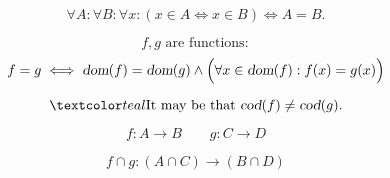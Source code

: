 
\begin{frame}{}
  \begin{center}
  \end{center}
\end{frame}

\begin{frame}{}
  \begin{axiom}
    \[
      \forall A: \forall B: \forall x: (x \in A \iff x \in B) \iff A = B.
    \]
  \end{axiom}

  \pause
  \vspace{0.80cm}
  \begin{theorem}
    \[
      f, g \text{ are functions}:
    \]
    \[
      f = g \iff \textsl{dom}(f) = \textsl{dom}(g) \land \Big(\forall x \in \textsl{dom}(f): f(x) = g(x)\Big)
    \]
  \end{theorem}

  \pause
  \[
    \teal{\text{It may be that } \cod{f} \neq \cod{g}.}
  \]
\end{frame}

\begin{frame}{}
  \[
    f: A \to B \qquad g: C \to D
  \]

  \begin{center}
  \end{center}

  \pause
  \begin{theorem}
    \[
      f \cap g: (A \cap C) \to (B \cap D)
    \]
  \end{theorem}
\end{frame}

